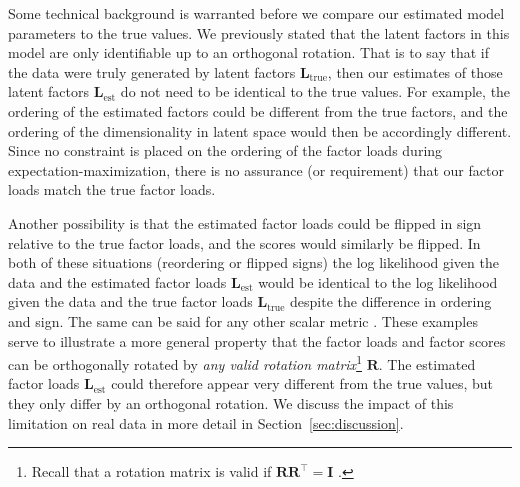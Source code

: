 \documentclass[twocolumn]{aastex62}
\newcommand{\vect}[1]{\boldsymbol{\mathbf{#1}}}
\renewcommand{\vec}[1]{\vect{#1}}
\newcommand{\transpose}{^\intercal}
\newcommand{\factorloads}{\textbf{L}}
\begin{document}
Some technical background is warranted before we compare our estimated model
parameters to the true values. We previously stated that the latent factors in this model are only
identifiable up to an orthogonal rotation. That is to say that
if the data were truly generated by latent factors $\factorloads_\textrm{true}$,
then our estimates of those latent factors $\factorloads_\textrm{est}$ do not need
to be identical to the true values. For example, the ordering of the estimated factors
could be different from the true factors, and the ordering of the dimensionality
in latent space would then be accordingly different. Since no constraint is
placed on the ordering of the factor loads during expectation-maximization,
there is no assurance (or requirement) that our factor loads match the true factor loads.




Another possibility is that the estimated factor loads could be flipped in sign 
relative to the true factor loads, and the scores would similarly be flipped. 
In both of these situations (reordering or flipped signs) the log likelihood 
given the data and the estimated factor loads $\factorloads_\textrm{est}$ 
would be identical to the log likelihood given the data and the true factor loads 
$\factorloads_\textrm{true}$
despite the difference in ordering and sign. The same can be said for any other
scalar metric \citep[e.g., Kullback-Leibler divergence;][]{Kullback:1951}.
These examples serve to illustrate a more 
general property that the factor loads and factor scores can be orthogonally 
rotated by \emph{any valid rotation matrix}\footnote{Recall that a rotation matrix is valid if 
$\vec{R}\vec{R}\transpose = \vec{I}\,\,$.} $\vec{R}$. The estimated factor loads 
$\factorloads_\textrm{est}$ could therefore appear very different from the true 
values, but they only differ by an orthogonal rotation. We discuss the impact of this limitation on real data in more detail in Section~\ref{sec:discussion}. 
\end{document}
